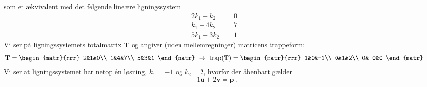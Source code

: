 \begin{example}
$$$$
som er ækvivalent med det følgende lineære ligningssystem
\begin{equation}
\begin{aligned}
2k_1+k_2&=0\\
k_1+4k_2&=7\\
5k_1+3k_2&=1
\end{aligned}
\end{equation}
Vi ser på ligningssystemets totalmatrix $\mathbf T$ og angiver (uden mellemregninger) matricens trappeform:
\begin{equation}\mathbf T=
\begin{matr}{rrr}
 2&1&0\\
 1&4&7\\
 5&3&1
\end{matr}
\,\,\rightarrow\,\,
\mathrm{trap}(\mathbf T)=
\begin{matr}{rrr}
 1&0&-1\\
 0&1&2\\
 0& 0&0
\end{matr}
\end{equation}
Vi ser at ligningssystemet har netop én løsning, $k_1=-1$ og $k_2=2$, hvorfor der åbenbart gælder
$$
-1\mathbf u+2\mathbf v=\mathbf p\,.
$$

\end{example}

